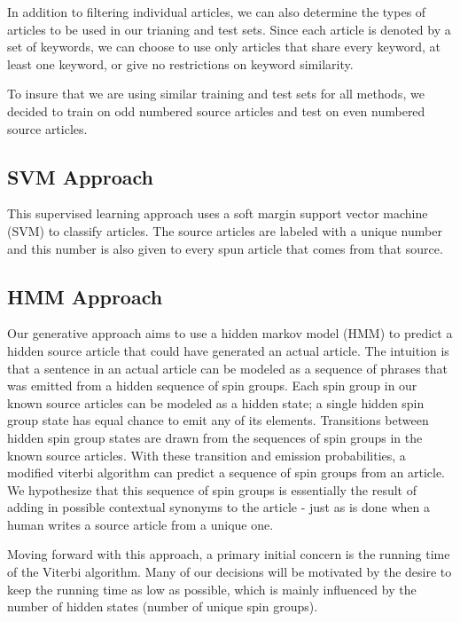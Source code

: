 \documentclass[11pt,letterpaper,oneside, titlepage]{scrartcl}
\begin{document}
In addition to filtering individual articles, we can also determine the types of articles to be used in our trianing and test sets. Since each article is denoted by a set of keywords, we can choose to use only articles that share every keyword, at least one keyword, or give no restrictions on keyword similarity.

To insure that we are using similar training and test sets for all methods, we decided to train on odd numbered source articles and test on even numbered source articles.


\subsection{SVM Approach}

This supervised learning approach uses a soft margin support vector machine (SVM) to classify articles. The source articles are labeled with a unique number and this number is also given to every spun article that comes from that source. 


\subsection{HMM Approach}

Our generative approach aims to use a hidden markov model (HMM) to predict a hidden source article that could have generated an actual article. The intuition is that a sentence in an actual article can be modeled as a sequence of phrases that was emitted from a hidden sequence of spin groups. Each spin group in our known source articles can be modeled as a hidden state; a single hidden spin group state has equal chance to emit any of its elements. Transitions between hidden spin group states are drawn from the sequences of spin groups in the known source articles. With these transition and emission probabilities, a modified viterbi algorithm can predict a sequence of spin groups from an article. We hypothesize that this sequence of spin groups is essentially the result of adding in possible contextual synonyms to the article - just as is done when a human writes a source article from a unique one.

Moving forward with this approach, a primary initial concern is the running time of the Viterbi algorithm. Many of our decisions will be motivated by the desire to keep the running time as low as possible, which is mainly influenced by the number of hidden states (number of unique spin groups).
\end{document}

